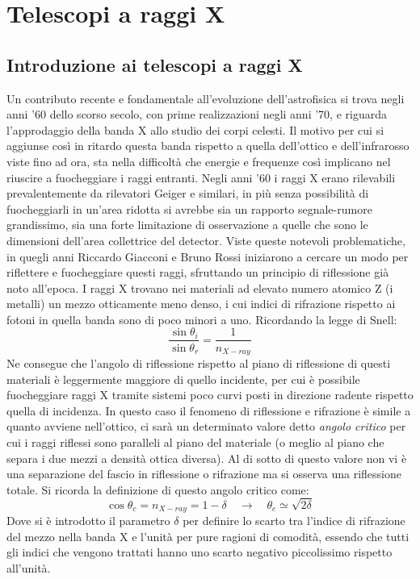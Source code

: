 \chapter{Telescopi a raggi X}

\section{Introduzione ai telescopi a raggi X}

Un contributo recente e fondamentale all'evoluzione dell'astrofisica si trova negli anni '60 dello scorso secolo, con prime realizzazioni negli anni '70, e riguarda l'approdaggio della banda X allo studio dei corpi celesti. Il motivo per cui si aggiunse così in ritardo questa banda rispetto a quella dell'ottico e dell'infrarosso viste fino ad ora, sta nella difficoltà che energie e frequenze così implicano nel riuscire a fuocheggiare i raggi entranti. Negli anni '60 i raggi X erano rilevabili prevalentemente da rilevatori Geiger e similari, in più senza possibilità di fuocheggiarli in un'area ridotta si avrebbe sia un rapporto segnale-rumore grandissimo, sia una forte limitazione di osservazione a quelle che sono le dimensioni dell'area collettrice del detector. Viste queste notevoli problematiche, in quegli anni Riccardo Giacconi e Bruno Rossi iniziarono a cercare un modo per riflettere e fuocheggiare questi raggi, sfruttando un principio di riflessione già noto all'epoca. I raggi X trovano nei materiali ad elevato numero atomico Z (i metalli) un mezzo otticamente meno denso, i cui indici di rifrazione rispetto ai fotoni in quella banda sono di poco minori a uno. Ricordando la legge di Snell:
\begin{equation}
    \frac{\sin\theta_i}{\sin\theta_r}=\frac{1}{n_{X-ray}}
\end{equation}
Ne consegue che l'angolo di riflessione rispetto al piano di riflessione di questi materiali è leggermente maggiore di quello incidente, per cui è possibile fuocheggiare raggi X tramite sistemi poco curvi posti in direzione radente rispetto quella di incidenza. In questo caso il fenomeno di riflessione e rifrazione è simile a quanto avviene nell'ottico, ci sarà un determinato valore detto \textit{angolo critico} per cui i raggi riflessi sono paralleli al piano del materiale (o meglio al piano che separa i due mezzi a densità ottica diversa). Al di sotto di questo valore non vi è una separazione del fascio in riflessione o rifrazione ma si osserva una riflessione totale. Si ricorda la definizione di questo angolo critico come:
\begin{equation*}
    \cos\theta_c = n_{X-ray} =
    1-\delta \quad \longrightarrow \quad
    \theta_c \simeq \sqrt{2\delta}
\end{equation*}
Dove si è introdotto il parametro $\delta$ per definire lo scarto tra l'indice di rifrazione del mezzo nella banda X e l'unità per pure ragioni di comodità, essendo che tutti gli indici che vengono trattati hanno uno scarto negativo piccolissimo rispetto all'unità.

